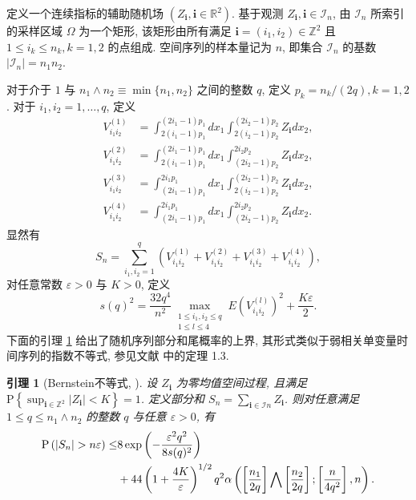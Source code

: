 \documentclass[a4paper,openay,14pt]{ctexbook}
\numberwithin{equation}{section}
\numberwithin{lem}{section}
\newtheorem{lemma}[theorem]{引理}%
\newtheorem{rema}[theorem]{注}%
\begin{document}


定义一个连续指标的辅助随机场 $(Z_{\mathbf{i}}, \mathbf{i}\in\mathbb{R}^2)$. 基于观测 ${Z_{\mathbf{i}}, \mathbf{i}\in\mathcal{I}_n}$, 由 $\mathcal{I}_n$ 所索引的采样区域 $\Omega$ 为一个矩形, 该矩形由所有满足 $\mathbf{i}=(i_1,i_2)\in\mathbb{Z}^2$ 且 $1\le i_k\le n_k, k=1,2$ 的点组成. 空间序列的样本量记为 $n$, 即集合 $\mathcal{I}_n$ 的基数 $|\mathcal{I}_n|=n_1 n_2$.

对于介于 $1$ 与 $n_1\wedge n_2\equiv \min\{n_1,n_2\}$ 之间的整数 $q$, 定义 $p_k=n_k/(2q), k=1,2$. 对于 $i_1,i_2=1,\ldots,q$, 定义
$$
\begin{aligned}
V_{i_1 i_2}^{(1)} & =\int_{2(i_1-1) p_1}^{(2 i_1-1) p_1} d x_1 \int_{2(i_2-1) p_2}^{(2 i_2-1) p_2} Z_\mathbf{i} d x_2, \\
V_{i_1 i_2}^{(2)} & =\int_{2(i_1-1) p_1}^{(2 i_1-1) p_1} d x_1 \int_{(2 i_2-1) p_2}^{2 i_2 p_2} Z_\mathbf{i} d x_2, \\
V_{i_1 i_2}^{(3)} & =\int_{(2 i_1-1) p_1}^{2 i_1 p_1} d x_1 \int_{2(i_2-1) p_2}^{(2 i_2-1) p_2} Z_\mathbf{i} d x_2, \\
V_{i_1 i_2}^{(4)} & =\int_{(2 i_1-1) p_1}^{2 i_1 p_1} d x_1 \int_{(2 i_2-1) p_2}^{2 i_2 p_2} Z_\mathbf{i} d x_2 .
\end{aligned}
$$
显然有
$$
S_n=\sum_{i_1, i_2=1}^q\left(V_{i_1 i_2}^{(1)}+V_{i_1 i_2}^{(2)}+V_{i_1 i_2}^{(3)}+V_{i_1 i_2}^{(4)}\right),
$$
对任意常数 $\varepsilon>0$ 与 $K>0$, 定义
$$
s(q)^2=\frac{32 q^4}{n^2} \max _{\substack{1 \leq i_1, i_2 \leq q \\ 1 \leq l \leq 4}} E\left(V_{i_1 i_2}^{(l)}\right)^2+\frac{K \varepsilon}{2}.
$$
下面的引理 \ref{Lemma:Bernstein} 给出了随机序列部分和尾概率的上界, 其形式类似于弱相关单变量时间序列的指数不等式, 参见文献\cite{bosq2012nonparametric} 中的定理 1.3.

\begin{lemma}[Bernstein不等式, \cite{yao2003exponential}]\label{Lemma:Bernstein}
设 ${Z_{\mathbf{i}}}$ 为零均值空间过程, 且满足$\mathrm{P}\left\{\sup_{\mathbf{i}\in\mathbb{Z}^2}\left\vert Z_{\mathbf{i}}\right\vert<K\right\} = 1$. 定义部分和 $S_n=\sum_{\mathbf{i}\in\mathcal{I}n} Z_{\mathbf{i}}$. 则对任意满足 $1\le q\le n_1\wedge n_2$ 的整数 $q$ 与任意 $\varepsilon>0$, 有
\begin{align*}
    \mathrm{P}\left(\left|S_n\right|>n \varepsilon\right) \leq
    &8\exp \left(-\frac{\varepsilon^2 q^2}{8 s(q)^2}\right)\notag\\
    &+ 44\left(1+\frac{4 K}{\varepsilon}\right)^{1 / 2} q^2 \alpha\left(\left[\frac{n_1}{2 q}\right] \bigwedge\left[\frac{n_2}{2 q}\right] ;\left[\frac{n}{4 q^2}\right], n\right).
    \end{align*}
\end{lemma}
\end{document}
